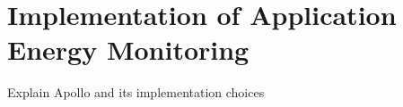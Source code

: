 \chapter{Implementation of Application Energy Monitoring}

Explain Apollo and its implementation choices
